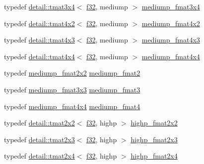 \begin{DoxyCompactItemize}
typedef \hyperlink{structglm_1_1detail_1_1tmat3x4}{detail\+::tmat3x4}$<$ \hyperlink{group__gtc__type__precision_ga0ec999b57f5330d9021256e96038df04}{f32}, mediump $>$ \hyperlink{group__gtc__type__precision_gafa5aaa948365f349840dfeb9eeebf0cd}{mediump\+\_\+fmat3x4}
\item 
typedef \hyperlink{structglm_1_1detail_1_1tmat4x2}{detail\+::tmat4x2}$<$ \hyperlink{group__gtc__type__precision_ga0ec999b57f5330d9021256e96038df04}{f32}, mediump $>$ \hyperlink{group__gtc__type__precision_ga09a2851d38fe3cf52735a1d26199bdcc}{mediump\+\_\+fmat4x2}
\item 
typedef \hyperlink{structglm_1_1detail_1_1tmat4x3}{detail\+::tmat4x3}$<$ \hyperlink{group__gtc__type__precision_ga0ec999b57f5330d9021256e96038df04}{f32}, mediump $>$ \hyperlink{group__gtc__type__precision_ga5e5de428d1e1da2c593a6245d92dd8c0}{mediump\+\_\+fmat4x3}
\item 
typedef \hyperlink{structglm_1_1detail_1_1tmat4x4}{detail\+::tmat4x4}$<$ \hyperlink{group__gtc__type__precision_ga0ec999b57f5330d9021256e96038df04}{f32}, mediump $>$ \hyperlink{group__gtc__type__precision_ga7f4ae9d05ca94005a0b7d8e3c59943cd}{mediump\+\_\+fmat4x4}
\item 
typedef \hyperlink{group__gtc__type__precision_gae9af1d96efbaeeb5c5edd9c7b0a24fa5}{mediump\+\_\+fmat2x2} \hyperlink{group__gtc__type__precision_ga5b9de77ef7403ffc972700219eca5450}{mediump\+\_\+fmat2}
\item 
typedef \hyperlink{group__gtc__type__precision_gaa7f015dd5b962a658178bb881d4620cc}{mediump\+\_\+fmat3x3} \hyperlink{group__gtc__type__precision_ga85f2267401434ea8c5463af040f0760c}{mediump\+\_\+fmat3}
\item 
typedef \hyperlink{group__gtc__type__precision_ga7f4ae9d05ca94005a0b7d8e3c59943cd}{mediump\+\_\+fmat4x4} \hyperlink{group__gtc__type__precision_ga6cd3ae1f3509b79061edcc83564769d4}{mediump\+\_\+fmat4}
\item 
typedef \hyperlink{structglm_1_1detail_1_1tmat2x2}{detail\+::tmat2x2}$<$ \hyperlink{group__gtc__type__precision_ga0ec999b57f5330d9021256e96038df04}{f32}, highp $>$ \hyperlink{group__gtc__type__precision_gaeb76f1230ecfd4c80635d3c618405e31}{highp\+\_\+fmat2x2}
\item 
typedef \hyperlink{structglm_1_1detail_1_1tmat2x3}{detail\+::tmat2x3}$<$ \hyperlink{group__gtc__type__precision_ga0ec999b57f5330d9021256e96038df04}{f32}, highp $>$ \hyperlink{group__gtc__type__precision_ga53c126d1650b460bc7496a6fd5e5e764}{highp\+\_\+fmat2x3}
\item 
typedef \hyperlink{structglm_1_1detail_1_1tmat2x4}{detail\+::tmat2x4}$<$ \hyperlink{group__gtc__type__precision_ga0ec999b57f5330d9021256e96038df04}{f32}, highp $>$ \hyperlink{group__gtc__type__precision_ga5df8430c47272adc901ef224d85a9c4d}{highp\+\_\+fmat2x4}

\end{DoxyCompactItemize}
